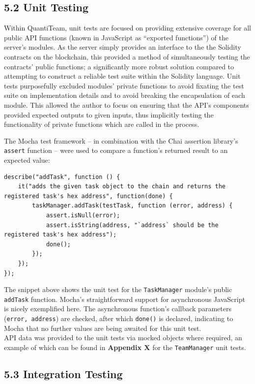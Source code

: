 \documentclass[12pt]{report}
\begin{document}
\subsection{5.2 Unit Testing}\label{unit-testing}

Within QuantiTeam, unit tests are focused on providing extensive
coverage for all public API functions (known in JavaScript as ``exported
functions'') of the server's modules. As the server simply provides an
interface to the the Solidity contracts on the blockchain, this provided
a method of simultaneously testing the contracts' public functions; a
significantly more robust solution compared to attempting to construct a
reliable test suite within the Solidity language. Unit tests
purposefully excluded modules' private functions to avoid fixating the
test suite on implementation details and to avoid breaking the
encapsulation of each
module\cite{hunt2003pragmatic}. This allowed the author to focus on ensuring that the API's
components provided expected outputs to given inputs, thus implicitly
testing the functionality of private functions which are called in the
process.

The Mocha test framework -- in combination with the Chai assertion
library's \texttt{assert} function -- were used to compare a function's
returned result to an expected value:

\begin{verbatim}
describe("addTask", function () {
    it("adds the given task object to the chain and returns the registered task's hex address", function(done) {
        taskManager.addTask(testTask, function (error, address) {
            assert.isNull(error);
            assert.isString(address, "`address` should be the registered task's hex address");
            done();
        });
    });
});
\end{verbatim}

The snippet above shows the unit test for the \texttt{TaskManager}
module's public \texttt{addTask} function. Mocha's straightforward
support for asynchronous JavaScript is nicely exemplified here. The
asynchronous function's callback parameters (\texttt{error,\ address})
are checked, after which \texttt{done()} is declared, indicating to
Mocha that no further values are being awaited for this unit test.\\
API data was provided to the unit tests via mocked objects where
required, an example of which can be found in \textbf{Appendix X} for
the \texttt{TeamManager} unit tests.

\subsection{5.3 Integration Testing}\label{integration-testing}
\end{document}
